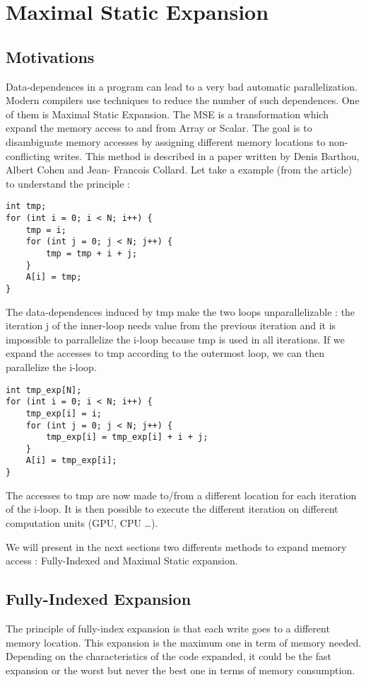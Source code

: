 \chapter{Maximal Static Expansion}\label{ch:MSE}

\section{Motivations}
Data-dependences in a program can lead to a very bad automatic parallelization. Modern compilers use techniques to reduce the number of such dependences. One of them is Maximal Static Expansion. The MSE is a transformation which expand the memory access to and from Array or Scalar. The goal is to disambiguate memory accesses by assigning different memory locations to non-conflicting writes. This method is described in a paper written by Denis Barthou, Albert Cohen and Jean- Francois Collard\cite{MSE}. Let take a example (from the article) to understand the principle :
\begin{lstlisting}[frame=single]
int tmp;
for (int i = 0; i < N; i++) {
    tmp = i;
    for (int j = 0; j < N; j++) {
        tmp = tmp + i + j;
    }
    A[i] = tmp;
}
\end{lstlisting}

The data-dependences induced by tmp make the two loops unparallelizable : the iteration j of the inner-loop needs value from the previous iteration and it is impossible to parrallelize the i-loop because tmp is used in all iterations. If we expand the accesses to tmp according to the outermost loop, we can then parallelize the i-loop.

\begin{lstlisting}[frame=single]
int tmp_exp[N];
for (int i = 0; i < N; i++) {
    tmp_exp[i] = i;
    for (int j = 0; j < N; j++) {
        tmp_exp[i] = tmp_exp[i] + i + j;
    }
    A[i] = tmp_exp[i];
}
\end{lstlisting}

The accesses to tmp are now made to/from a different location for each iteration of the i-loop. It is then possible to execute the different iteration on different computation units (GPU, CPU …).

We will present in the next sections two differents methods to expand memory access : Fully-Indexed and Maximal Static expansion.

\section{Fully-Indexed Expansion}
The principle of fully-index expansion is that each write goes to a different memory location. This expansion is the maximum one in term of memory needed. Depending on the characteristics of the code expanded, it could be the fast expansion or the worst but never the best one in terms of memory consumption.

